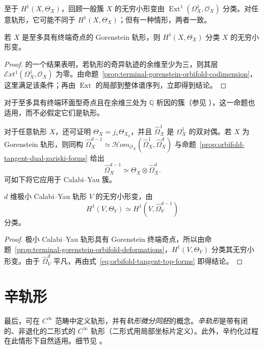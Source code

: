 至于 $H^1(X,\Theta_X)$，回顾一般簇 $X$ 的无穷小形变由 $\operatorname{Ext}^1(\Omega_X^1,\mathcal O_X)$ 分类。对任意轨形，它可能不同于 $H^1(X,\Theta_X)$；但有一种情形，两者一致。
\begin{proposition}\label{prop:terminal-gorenstein-orbifold-deformations}
若 $X$ 是至多具有终端奇点的 Gorenstein 轨形，则 $H^1(X,\Theta_X)$ 分类 $X$ 的无穷小形变。
\end{proposition}
\begin{proof}
 的一个结果表明，若轨形的奇异轨迹的余维至少为三，则其层 $\mathcal Ext^1(\Omega_X^1,\mathcal O_X)$ 为零。由命题~\ref{prop:terminal-gorenstein-orbifold-codimension}，这里满足该条件；再由 $\operatorname{Ext}$ 的局部到整体谱序列，立即得到结论。
\end{proof}

对于至多具有终端环面型奇点且在余维三处为 $\mathbb Q$ 析因的簇（参见 ），这一命题也适用，而不必假定它们是轨形。

对于任意轨形 $X$，还可证明 $\Theta_X=j_*\Theta_{X_0}$，并且 $\widehat\Omega_X^1$ 是 $\Omega_X^1$ 的双对偶。若 $X$ 为 Gorenstein 轨形，则同构 $\widehat\Omega_X^{d-1}\simeq\mathcal Hom_{\mathcal O_X}(\widehat\Omega_X^1,\widehat\Omega_X^d)$ 与命题~\ref{prop:orbifold-tangent-dual-zariski-forms} 给出
\begin{equation}\label{eq:orbifold-tangent-top-forms}
\widehat\Omega_X^{d-1}\simeq\Theta_X\otimes\widehat\Omega_X^d.
\end{equation}
可如下将它应用于 Calabi--Yau 簇。
\begin{proposition}\label{prop:minimal-cy-orbifold-deformations}
$d$ 维极小 Calabi--Yau 轨形 $V$ 的无穷小形变，由
\[
H^1(V,\Theta_V)\simeq H^1(V,\widehat\Omega_V^{d-1})
\]
分类。
\end{proposition}
\begin{proof}
极小 Calabi--Yau 轨形具有 Gorenstein 终端奇点，所以由命题~\ref{prop:terminal-gorenstein-orbifold-deformations}，$H^1(V,\Theta_V)$ 分类其无穷小形变。由于 $\widehat\Omega_V^d$ 平凡，再由式~\eqref{eq:orbifold-tangent-top-forms} 即得结论。
\end{proof}

\section{辛轨形}\label{sec:symplectic-orbifolds}
最后，可在 $C^\infty$ 范畴中定义轨形，并有\emph{轨形微分同胚}的概念。\emph{辛轨形}是带有闭的、非退化的二形式的 $C^\infty$ 轨形（二形式用局部坐标片定义）。此外，辛约化过程在此情形下自然适用。细节见 。
